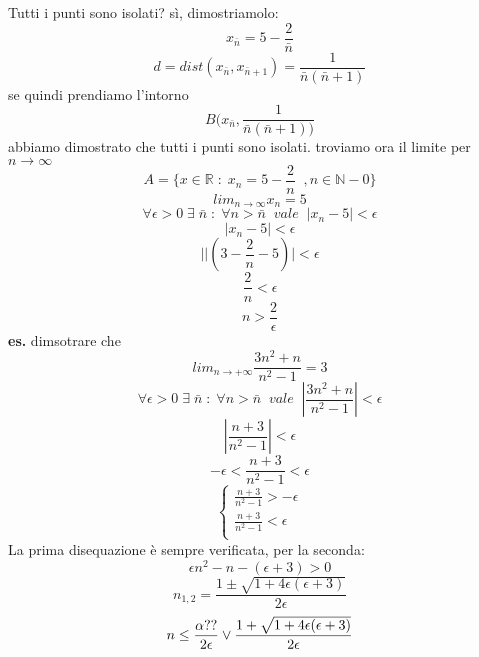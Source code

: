 Tutti i punti sono isolati? sì, dimostriamolo:
\[
    x_{\bar{n}} = 5 - \frac{2}{\bar{n}}
\]
\[
    d = dist(x_{\bar{n}}, x_{\bar{n}+1}) = \frac{1}{\bar{n}(\bar{n}+1)}
\]
se quindi prendiamo l'intorno
\[
    B(x_{\bar{n}},\frac{1}{\bar{n}(\bar{n}+1))}
\]
abbiamo dimostrato che tutti i punti sono isolati.
\newline
troviamo ora il limite per $n \rightarrow \infty$
\[
    A = \{x \in \mathbb{R} \;:\; x_n = 5-\frac{2}{n} \;\;, n\in \mathbb{N} -{0}\}
\]
\[
    lim_{n \rightarrow \infty} x_n = 5
\]
\[
    \forall \epsilon > 0 \;\exists\; \bar{n} \;:\; \forall n > \bar{n} \;\;vale\;\; |x_n-5| < \epsilon 
\]
\[
    |x_n-5| <\epsilon 
\]
\[
    ||(3-\frac{2}{n}- 5)| < \epsilon
\]
\[
    \frac{2}{n}< \epsilon
\]
\[
    n> \frac{2}{\epsilon}
\]
\textbf{es.} dimsotrare che
\[
    lim_{n\rightarrow+\infty} \frac{3n^2 +n}{n^2-1} = 3
\]
\[
    \forall \epsilon > 0 \;\exists\; \bar{n} \;:\; \forall n > \bar{n} \;\;vale\;\; |\frac{3n^2 +n}{n^2-1}| <\epsilon 
\]
\[
    |\frac{n+3}{n^2-1}|<\epsilon
\]
\[
    -\epsilon< \frac{n+3}{n^2-1}< \epsilon
\]
\[
    \begin{cases}
        \frac{n+3}{n^2-1}>-\epsilon \\
        \frac{n+3}{n^2-1}< \epsilon \\
    \end{cases}
\]
La prima disequazione è sempre verificata, per la seconda:
\[
    \epsilon n^2 - n -(\epsilon + 3) > 0
\]
\[
    n_{1,2} = \frac{1 \pm \sqrt{1+4\epsilon(\epsilon+3)}}{2\epsilon}
\]
\[
    n \leq \frac{\-\alpha ??}{2\epsilon} \lor \frac{1+\sqrt{1+4\epsilon(\epsilon+3)}}{2\epsilon}
\]

